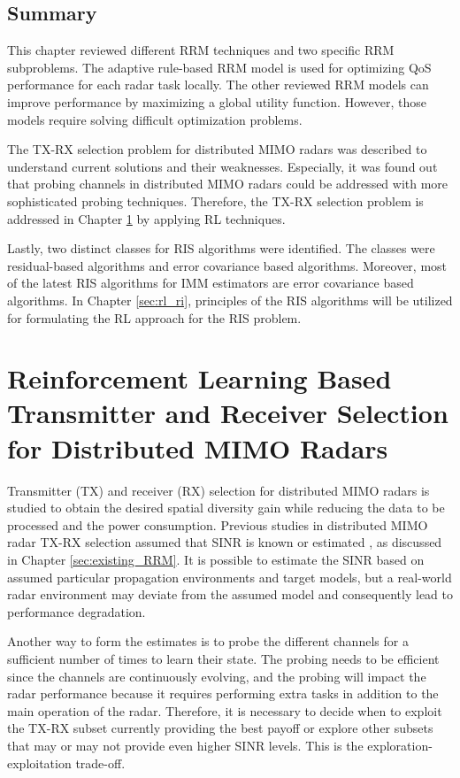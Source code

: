 \documentclass[english, 12pt, a4paper, elec, utf8, a-1b, online]{aaltothesis}
\begin{document}
\subsection{Summary}

This chapter reviewed different RRM techniques and two specific RRM subproblems.
The adaptive rule-based RRM model is used for optimizing QoS performance for each radar task locally.
The other reviewed RRM models can improve performance by maximizing a global utility function.
However, those models require solving difficult optimization problems.

The TX-RX selection problem for distributed MIMO radars was described to understand current solutions and their weaknesses.
Especially, it was found out that probing channels in distributed MIMO radars could be addressed with more sophisticated probing techniques.
Therefore, the TX-RX selection problem is addressed in Chapter \ref{sec:RL_TX_RX} by applying RL techniques.

Lastly, two distinct classes for RIS algorithms were identified. 
The classes were residual-based algorithms and error covariance based algorithms.
Moreover, most of the latest RIS algorithms for IMM estimators are error covariance based algorithms.
In Chapter \ref{sec:rl_ri}, principles of the RIS algorithms will be utilized for formulating the RL approach for the RIS problem.



\newpage
\section{Reinforcement Learning Based Transmitter and Receiver Selection for Distributed MIMO Radars}\label{sec:RL_TX_RX}

Transmitter (TX) and receiver (RX) selection for distributed MIMO radars is studied to obtain the desired spatial diversity gain while reducing the data to be processed and the power consumption.
Previous studies in distributed MIMO radar TX-RX selection assumed that SINR is known or estimated \cite{Godrich2011a, Godrich2011, Sun2014}, as discussed in Chapter \ref{sec:existing_RRM}.
It is possible to estimate the SINR based on assumed particular propagation environments and target models, but a real-world radar environment may deviate from the assumed model and consequently lead to performance degradation.

Another way to form the estimates is to probe the different channels for a sufficient number of times to learn their state.
The probing needs to be efficient since the channels are continuously evolving, and the probing will impact the radar performance because it requires performing extra tasks in addition to the main operation of the radar.  Therefore, it is necessary to decide when to exploit the TX-RX subset currently providing the best payoff or explore other subsets that may or may not provide even higher SINR levels. 
This is the exploration-exploitation trade-off.
\end{document}
